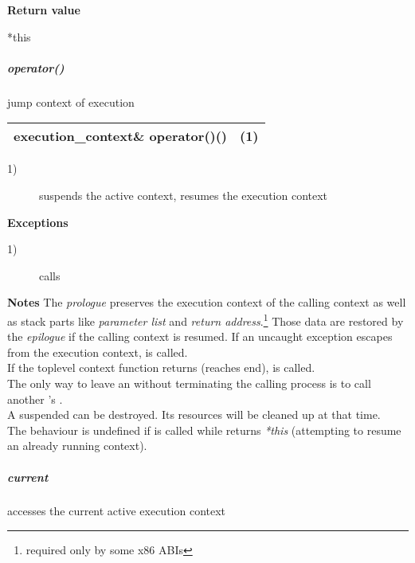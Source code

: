 {\bfseries Return value}
\begin{description}
    \item[*this]
\end{description}

\subparagraph*{operator()}
jump context of execution\\

\begin{tabular}{ l l }
    \midrule

    {\ttfamily\small\color{black}execution\_context\& {\color{blue}operator}()()} & (1)\\

    \midrule
\end{tabular}

\begin{description}
    \item[1)] suspends the active context, resumes the execution context\\
\end{description}

{\bfseries Exceptions}
\begin{description}
    \item[1)] calls \\
\end{description}

{\bfseries Notes}
\newline
The \emph{prologue} preserves the execution context of the calling context as well
as stack parts like \emph{parameter list} and \emph{return
address}.\footnote{required only by some x86 ABIs} Those data are restored by the
\emph{epilogue} if the calling context is resumed.
\newline
If an uncaught exception escapes from the execution
context,  is called.\\
If the toplevel context function returns (reaches end), 
is called.\\
The only way to leave an  without terminating the
calling process is to call
another 's .\\
A suspended  can be destroyed. Its resources will be
cleaned up at that time.\\
The behaviour is undefined if  is called while 
returns \emph{*this} (attempting to resume an already running context).

\subparagraph*{current}
accesses the current active execution context\\

